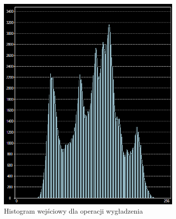 \begin{figure}
  \centering
  \begin{subfigure}[b]{0.45\textwidth}
    \includegraphics[width=\textwidth]{img/smooth-histogram-before}
    \caption{Histogram wejściowy dla operacji wygładzenia}
    \label{fig:equalize_histogram_before}
  \end{subfigure}
  ~
  \begin{subfigure}[b]{0.45\textwidth}

\end{subfigure}
\end{figure}
